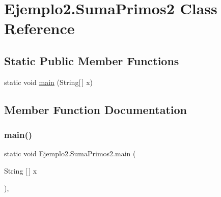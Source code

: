 \hypertarget{class_ejemplo2_1_1_suma_primos2}{}\section{Ejemplo2.\+Suma\+Primos2 Class Reference}
\label{class_ejemplo2_1_1_suma_primos2}
\subsection*{Static Public Member Functions}
\begin{DoxyCompactItemize}
\item 
static void \mbox{\hyperlink{class_ejemplo2_1_1_suma_primos2_a1f5646e708bd2bfb556b6172f4c8e472}{main}} (String\mbox{[}$\,$\mbox{]} x)
\end{DoxyCompactItemize}


\subsection{Member Function Documentation}
\mbox{\label{class_ejemplo2_1_1_suma_primos2_a1f5646e708bd2bfb556b6172f4c8e472}} 
\subsubsection{\texorpdfstring{main()}{main()}}
{\footnotesize\ttfamily static void Ejemplo2.\+Suma\+Primos2.\+main (\begin{DoxyParamCaption}\item[{String \mbox{[}$\,$\mbox{]}}]{x }\end{DoxyParamCaption})\hspace{0.3cm}{\ttfamily [inline]}, {\ttfamily [static]}}



